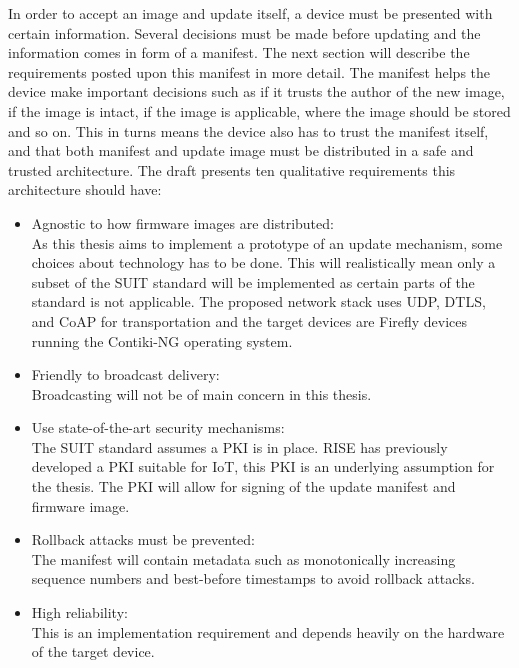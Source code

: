 \documentclass[0-thesis.tex]{subfiles}
\begin{document}
In order to accept an image and update itself, a device must be presented with certain
information. Several decisions must be made before updating and the information comes in
form of a manifest. The next section will describe the requirements posted upon this
manifest in more detail. The manifest helps the device make important decisions such
as if it trusts the author of the new image, if the image is intact, if the image is
applicable, where the image should be stored and so on. This in turns means the device
also has to trust the manifest itself, and that both manifest and update image must be
distributed in a safe and trusted architecture. The draft \parencite{suit-architecture}
presents ten qualitative requirements this architecture should have:
\begin{itemize}
    \item Agnostic to how firmware images are distributed:\\
            As this thesis aims to implement a prototype of an update mechanism, some
            choices about technology has to be done. This will realistically mean only a
            subset of the SUIT standard will be implemented as certain parts of the
            standard is not applicable. The proposed network stack uses UDP, DTLS, and
            CoAP for transportation and the target devices are Firefly devices running
            the Contiki-NG operating system.
    \item Friendly to broadcast delivery:\\
            Broadcasting will not be of main concern in this thesis.
    \item Use state-of-the-art security mechanisms:\\
            The SUIT standard assumes a PKI is in place. RISE has previously developed a
            PKI suitable for IoT, this PKI is an underlying assumption for the thesis. The
            PKI will allow for signing of the update manifest and firmware image.
    \item Rollback attacks must be prevented:\\
            The manifest will contain metadata such as monotonically increasing sequence
            numbers and best-before timestamps to avoid rollback attacks.
    \item High reliability:\\
            This is an implementation requirement and depends heavily on the hardware of
            the target device. %

\end{itemize}
\end{document}
